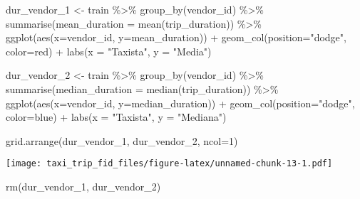 \documentclass[
]{article}
\newenvironment{Shaded}{\begin{snugshade}}{\end{snugshade}}
\newcommand{\AttributeTok}[1]{\textcolor[rgb]{0.77,0.63,0.00}{#1}}
\newcommand{\DecValTok}[1]{\textcolor[rgb]{0.00,0.00,0.81}{#1}}
\newcommand{\FunctionTok}[1]{\textcolor[rgb]{0.00,0.00,0.00}{#1}}
\newcommand{\NormalTok}[1]{#1}
\newcommand{\OtherTok}[1]{\textcolor[rgb]{0.56,0.35,0.01}{#1}}
\newcommand{\SpecialCharTok}[1]{\textcolor[rgb]{0.00,0.00,0.00}{#1}}
\newcommand{\StringTok}[1]{\textcolor[rgb]{0.31,0.60,0.02}{#1}}
\begin{document}
\begin{Shaded}
\begin{Highlighting}[]
\NormalTok{dur\_vendor\_1 }\OtherTok{\textless{}{-}}\NormalTok{ train }\SpecialCharTok{\%\textgreater{}\%}
  \FunctionTok{group\_by}\NormalTok{(vendor\_id) }\SpecialCharTok{\%\textgreater{}\%}
  \FunctionTok{summarise}\NormalTok{(}\AttributeTok{mean\_duration =} \FunctionTok{mean}\NormalTok{(trip\_duration)) }\SpecialCharTok{\%\textgreater{}\%}
  \FunctionTok{ggplot}\NormalTok{(}\FunctionTok{aes}\NormalTok{(}\AttributeTok{x=}\NormalTok{vendor\_id, }\AttributeTok{y=}\NormalTok{mean\_duration)) }\SpecialCharTok{+}
  \FunctionTok{geom\_col}\NormalTok{(}\AttributeTok{position=}\StringTok{"dodge"}\NormalTok{, }\AttributeTok{color=}\StringTok{\textquotesingle{}red\textquotesingle{}}\NormalTok{) }\SpecialCharTok{+}
  \FunctionTok{labs}\NormalTok{(}\AttributeTok{x =} \StringTok{"Taxista"}\NormalTok{, }\AttributeTok{y =} \StringTok{"Media"}\NormalTok{)}

\NormalTok{dur\_vendor\_2 }\OtherTok{\textless{}{-}}\NormalTok{ train }\SpecialCharTok{\%\textgreater{}\%}
  \FunctionTok{group\_by}\NormalTok{(vendor\_id) }\SpecialCharTok{\%\textgreater{}\%}
  \FunctionTok{summarise}\NormalTok{(}\AttributeTok{median\_duration =} \FunctionTok{median}\NormalTok{(trip\_duration)) }\SpecialCharTok{\%\textgreater{}\%}
  \FunctionTok{ggplot}\NormalTok{(}\FunctionTok{aes}\NormalTok{(}\AttributeTok{x=}\NormalTok{vendor\_id, }\AttributeTok{y=}\NormalTok{median\_duration)) }\SpecialCharTok{+}
  \FunctionTok{geom\_col}\NormalTok{(}\AttributeTok{position=}\StringTok{"dodge"}\NormalTok{, }\AttributeTok{color=}\StringTok{\textquotesingle{}blue\textquotesingle{}}\NormalTok{) }\SpecialCharTok{+}
  \FunctionTok{labs}\NormalTok{(}\AttributeTok{x =} \StringTok{"Taxista"}\NormalTok{, }\AttributeTok{y =} \StringTok{"Mediana"}\NormalTok{)}

\FunctionTok{grid.arrange}\NormalTok{(dur\_vendor\_1, dur\_vendor\_2, }\AttributeTok{ncol=}\DecValTok{1}\NormalTok{)}
\end{Highlighting}
\end{Shaded}

\texttt{[image: taxi\_trip\_fid\_files/figure-latex/unnamed-chunk-13-1.pdf]}

\begin{Shaded}
\begin{Highlighting}[]
\FunctionTok{rm}\NormalTok{(dur\_vendor\_1, dur\_vendor\_2)}
\end{Highlighting}
\end{Shaded}
\end{document}
